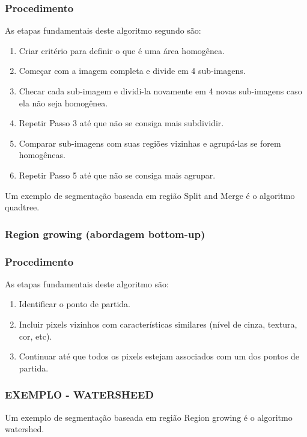 \subsubsection*{Procedimento}
As etapas fundamentais deste algoritmo segundo  são: 
\begin{enumerate}
    \item Criar critério para definir o que é uma área homogênea.
    \item Começar com a imagem completa e divide em 4 sub-imagens.
    \item Checar cada sub-imagem e dividi-la novamente em 4 novas sub-imagens caso ela não seja homogênea.
    \item Repetir Passo 3 até que não se consiga mais subdividir.
    \item Comparar sub-imagens com suas regiões vizinhas e agrupá-las se forem homogêneas.
    \item Repetir Passo 5 até que não se consiga mais agrupar.
\end{enumerate}
Um exemplo de segmentação baseada em região Split and Merge é o algoritmo quadtree.


\subsubsection{Region growing (abordagem bottom-up)}
\subsubsection*{Procedimento}
As etapas fundamentais deste algoritmo são: 
\begin{enumerate}
    \item Identificar o ponto de partida.
    \item Incluir pixels vizinhos com características similares (nível de cinza, textura, cor, etc).
    \item Continuar até que todos os pixels estejam associados com um dos pontos de partida.
\end{enumerate}

\subsubsection*{EXEMPLO - WATERSHEED}
Um exemplo de segmentação baseada em região Region growing é o algoritmo watershed. 

